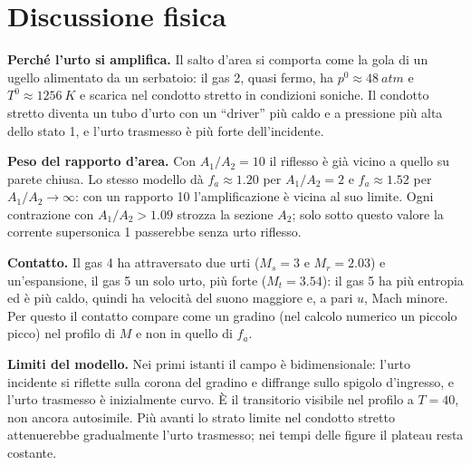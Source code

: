 \documentclass[11pt,a4paper]{article}
\newcommand{\Mr}{M_{r}}
\newcommand{\fa}{f_a}
\begin{document}
\section{Discussione fisica}\label{sec:disc}
\textbf{Perché l'urto si amplifica.} Il salto d'area si comporta come la gola di un ugello alimentato da un
serbatoio: il gas 2, quasi fermo, ha $p^0\approx\SI{48}{atm}$ e $T^0\approx\SI{1256}{K}$ e scarica nel condotto
stretto in condizioni soniche. Il condotto stretto diventa un tubo d'urto con un ``driver'' più caldo e a
pressione più alta dello stato 1, e l'urto trasmesso è più forte dell'incidente.

\textbf{Peso del rapporto d'area.} Con $A_1/A_2=10$ il riflesso è già vicino a quello su parete chiusa. Lo stesso
modello dà $\fa\approx\num{1.20}$ per $A_1/A_2=2$ e $\fa\approx\num{1.52}$ per $A_1/A_2\to\infty$: con un rapporto 10
l'amplificazione è vicina al suo limite. Ogni contrazione con $A_1/A_2>\num{1.09}$ strozza la sezione $A_2$;
solo sotto questo valore la corrente supersonica 1 passerebbe senza urto riflesso.

\textbf{Contatto.} Il gas 4 ha attraversato due urti ($M_s=3$ e $\Mr=\num{2.03}$) e un'espansione, il gas 5 un solo
urto, più forte ($M_t=\num{3.54}$): il gas 5 ha più entropia ed è più caldo, quindi ha velocità del suono
maggiore e, a pari $u$, Mach minore. Per questo il contatto compare come un gradino (nel calcolo numerico un
piccolo picco) nel profilo di $M$ e non in quello di $\fa$.

\textbf{Limiti del modello.} Nei primi istanti il campo è bidimensionale: l'urto incidente si riflette sulla
corona del gradino e diffrange sullo spigolo d'ingresso, e l'urto trasmesso è inizialmente curvo. È il
transitorio visibile nel profilo a $T=40$, non ancora autosimile. Più avanti lo strato limite nel condotto
stretto attenuerebbe gradualmente l'urto trasmesso; nei tempi delle figure il plateau resta costante.
\end{document}

